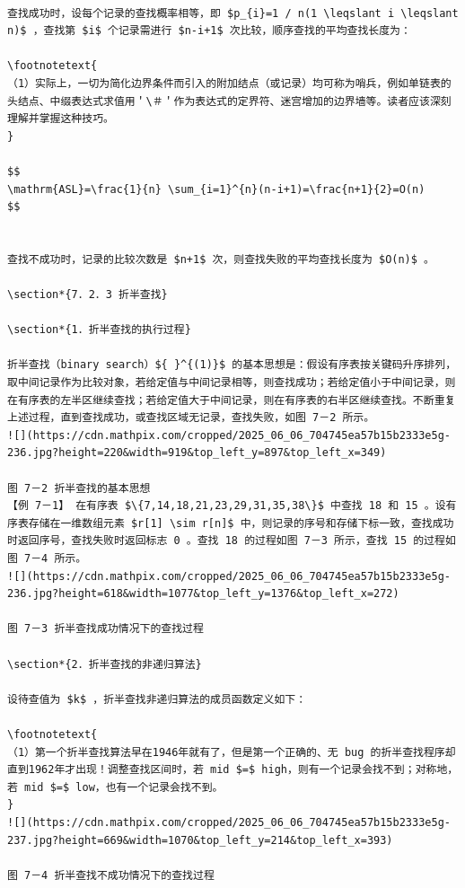\documentclass[10pt]{article}
\let\svthefootnote\thefootnote
\newcommand\blfootnotetext[1]{%
  \let\thefootnote\relax\footnote{#1}%
  \addtocounter{footnote}{-1}%
  \let\thefootnote\svthefootnote%
}
\let\svfootnotetext\footnotetext
\renewcommand\footnotetext[2][?]{%
  \if\relax#1\relax%
    \ifnum\value{footnote}=0\blfootnotetext{#2}\else\svfootnotetext{#2}\fi%
  \else%
    \if?#1\ifnum\value{footnote}=0\blfootnotetext{#2}\else\svfootnotetext{#2}\fi%
    \else\svfootnotetext[#1]{#2}\fi%
  \fi
}
\begin{document}
\begin{verbatim}

查找成功时，设每个记录的查找概率相等，即 $p_{i}=1 / n(1 \leqslant i \leqslant n)$ ，查找第 $i$ 个记录需进行 $n-i+1$ 次比较，顺序查找的平均查找长度为：

\footnotetext{
（1）实际上，一切为简化边界条件而引入的附加结点（或记录）均可称为哨兵，例如单链表的头结点、中缀表达式求值用＇\＃＇作为表达式的定界符、迷宫增加的边界墙等。读者应该深刻理解并掌握这种技巧。
}

$$
\mathrm{ASL}=\frac{1}{n} \sum_{i=1}^{n}(n-i+1)=\frac{n+1}{2}=O(n)
$$


查找不成功时，记录的比较次数是 $n+1$ 次，则查找失败的平均查找长度为 $O(n)$ 。

\section*{7．2．3 折半查找}

\section*{1．折半查找的执行过程}

折半查找（binary search）${ }^{(1)}$ 的基本思想是：假设有序表按关键码升序排列，取中间记录作为比较对象，若给定值与中间记录相等，则查找成功；若给定值小于中间记录，则在有序表的左半区继续查找；若给定值大于中间记录，则在有序表的右半区继续查找。不断重复上述过程，直到查找成功，或查找区域无记录，查找失败，如图 7－2 所示。
![](https://cdn.mathpix.com/cropped/2025_06_06_704745ea57b15b2333e5g-236.jpg?height=220&width=919&top_left_y=897&top_left_x=349)

图 7－2 折半查找的基本思想
【例 7－1】 在有序表 $\{7,14,18,21,23,29,31,35,38\}$ 中查找 18 和 15 。设有序表存储在一维数组元素 $r[1] \sim r[n]$ 中，则记录的序号和存储下标一致，查找成功时返回序号，查找失败时返回标志 0 。查找 18 的过程如图 7－3 所示，查找 15 的过程如图 7－4 所示。
![](https://cdn.mathpix.com/cropped/2025_06_06_704745ea57b15b2333e5g-236.jpg?height=618&width=1077&top_left_y=1376&top_left_x=272)

图 7－3 折半查找成功情况下的查找过程

\section*{2．折半查找的非递归算法}

设待查值为 $k$ ，折半查找非递归算法的成员函数定义如下：

\footnotetext{
（1）第一个折半查找算法早在1946年就有了，但是第一个正确的、无 bug 的折半查找程序却直到1962年才出现！调整查找区间时，若 mid $=$ high，则有一个记录会找不到；对称地，若 mid $=$ low，也有一个记录会找不到。
}
![](https://cdn.mathpix.com/cropped/2025_06_06_704745ea57b15b2333e5g-237.jpg?height=669&width=1070&top_left_y=214&top_left_x=393)

图 7－4 折半查找不成功情况下的查找过程
\end{verbatim}
\end{document}
